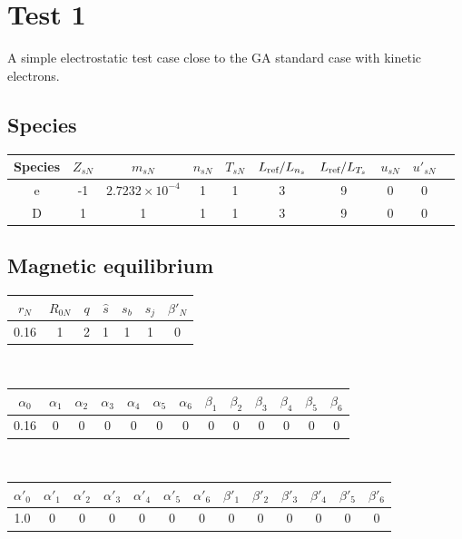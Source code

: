 \documentclass[fleqn]{report}
\begin{document}
\section{Test 1}
A simple electrostatic test case close to the GA standard case with kinetic electrons.
\subsection{Species}
\begin{tabular}{c c c c c c c c c c}
\hline
Species & $Z_{sN}$ & $m_{sN}$ & $n_{sN}$ & $T_{sN}$ & $L_{\textrm{ref}}/L_{n_s}$ & $L_{\textrm{ref}}/L_{T_s}$ & $u_{sN}$ & $u'_{sN}$ \\ [0.5ex]
\hline
e & -1 & $2.7232\times10^{-4}$ & 1 & 1 & 3 & 9 & 0 & 0 \\ [0.5ex]
\hline 
D &  1 & 1 & 1 & 1 & 3 & 9 & 0 & 0 \\ [0.5ex]
\hline
\end{tabular}

\subsection{Magnetic equilibrium}
\begin{tabular}{c c c c c c c}
\hline
$r_N$ & $R_{0N}$ & $q$ & $\hat{s}$ & $s_b$ & $s_j$ & $\beta'_N$ \\ [0.5ex]
\hline
0.16 & 1 & 2 & 1 & 1 & 1 & 0 \\
\hline
\end{tabular}\\
\begin{tabular}{c c c c c c c c c c c c c}
\hline
$\alpha_0$ & $\alpha_1$ & $\alpha_2$ & $\alpha_3$ & $\alpha_4$ & $\alpha_5$ & $\alpha_6$ 
& $\beta_1$ & $\beta_2$ & $\beta_3$ & $\beta_4$ & $\beta_5$ & $\beta_6$   \\ [0.5ex]
\hline
 0.16 & 0 & 0 & 0 & 0 & 0 & 0 & 0 & 0 & 0 & 0 & 0 & 0 \\
\hline
\end{tabular}\\
\begin{tabular}{c c c c c c c c c c c c c}
\hline
$\alpha'_0$ & $\alpha'_1$ & $\alpha'_2$ & $\alpha'_3$ & $\alpha'_4$ & $\alpha'_5$ & $\alpha'_6$ 
& $\beta'_1$ & $\beta'_2$ & $\beta'_3$ & $\beta'_4$ & $\beta'_5$ & $\beta'_6$   \\ [0.5ex]
\hline
1.0 & 0 & 0 & 0 & 0 & 0  & 0 & 0 & 0 & 0  & 0 & 0 & 0 \\
\hline
\end{tabular}
\end{document}
